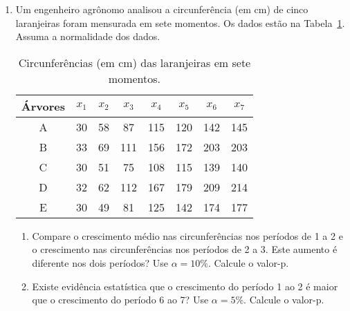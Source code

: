 \documentclass[8pt, a4paper]{article}
\begin{document}
\begin{enumerate}
	\item Um engenheiro agrônomo analisou a circunferência (em cm) de cinco laranjeiras foram mensurada em sete momentos. Os dados estão na Tabela~\ref{tab:laranjeiras-circ}. Assuma a normalidade dos dados.
	\begin{table}[ht]
		\centering
		\begin{tabular}{c|ccccccc}
			\toprule[0.05cm]
			Árvores & $x_1$ & $x_2$ & $x_3$ & $x_4$ & $x_5$ & $x_6$ & $x_7$ \\ 
			\midrule[0.025cm]
			A & 30 & 58 & 87 & 115 & 120 & 142 & 145 \\ 
			B & 33 & 69 & 111 & 156 & 172 & 203 & 203 \\ 
			C & 30 & 51 & 75 & 108 & 115 & 139 & 140 \\ 
			D & 32 & 62 & 112 & 167 & 179 & 209 & 214 \\ 
			E & 30 & 49 & 81 & 125 & 142 & 174 & 177 \\ 
			\bottomrule[0.05cm]
		\end{tabular}
		\caption{Circunferências (em cm) das laranjeiras em sete momentos.} 
		\label{tab:laranjeiras-circ}
	\end{table}
	\begin{enumerate}
		\item Compare o crescimento médio nas circunferências nos períodos de 1  a 2 e o crescimento nas circunferências nos períodos de 2 a 3. Este aumento é diferente nos dois períodos? Use $\alpha = 10\%$. Calcule o valor-p. 
		\item Existe evidência estatística que o crescimento do período 1 ao 2 é maior que o crescimento do período 6 ao 7? Use $\alpha = 5\%$. Calcule o valor-p. 
	\end{enumerate}


\end{enumerate}
\end{document}

